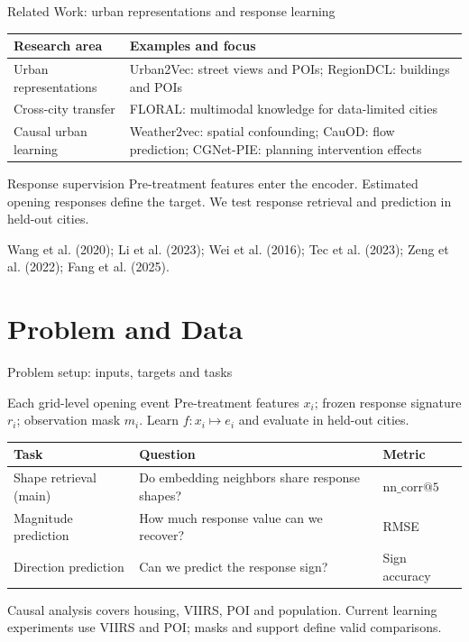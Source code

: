 \documentclass[aspectratio=169,11pt]{beamer}
\begin{document}
\begin{frame}{Related Work: urban representations and response learning}
\small
\begin{tabular}{p{}p{}}
\toprule
Research area & Examples and focus\\
\midrule
Urban representations & Urban2Vec: street views and POIs; RegionDCL: buildings and POIs\\
Cross-city transfer & FLORAL: multimodal knowledge for data-limited cities\\
Causal urban learning & Weather2vec: spatial confounding; CauOD: flow prediction; CGNet-PIE: planning intervention effects\\
\bottomrule
\end{tabular}
\begin{block}{Response supervision}
Pre-treatment features enter the encoder. Estimated opening responses define the target.
We test response retrieval and prediction in held-out cities.
\end{block}
\footnotesize Wang et al. (2020); Li et al. (2023); Wei et al. (2016);
Tec et al. (2023); Zeng et al. (2022); Fang et al. (2025).
\end{frame}

\section{Problem and Data}

\begin{frame}{Problem setup: inputs, targets and tasks}
\small
\begin{block}{Each grid-level opening event}
Pre-treatment features $x_i$; frozen response signature $r_i$; observation mask $m_i$.
Learn $f:x_i\mapsto e_i$ and evaluate in held-out cities.
\end{block}
\begin{tabular}{p{}p{}p{}}
\toprule
Task & Question & Metric\\
\midrule
Shape retrieval (main) & Do embedding neighbors share response shapes? & $\mathrm{nn\_corr@5}$\\
Magnitude prediction & How much response value can we recover? & RMSE\\
Direction prediction & Can we predict the response sign? & Sign accuracy\\
\bottomrule
\end{tabular}
\par\medskip\footnotesize Causal analysis covers housing, VIIRS, POI and population.
Current learning experiments use VIIRS and POI; masks and support define valid comparisons.
\end{frame}
\end{document}
